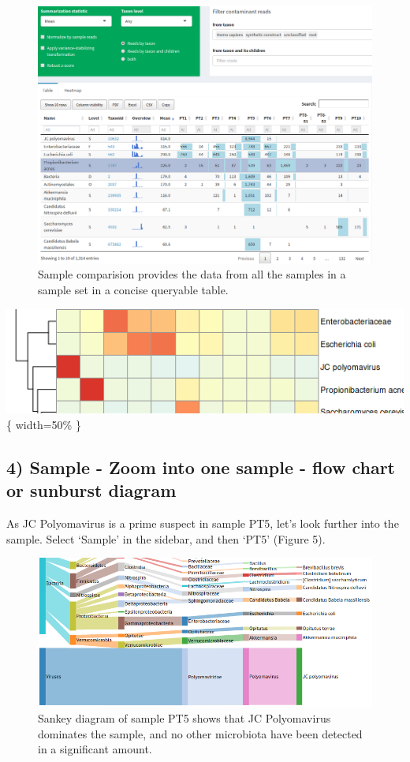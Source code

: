 \documentclass[]{article}
\begin{document}
\begin{figure}[htbp]
\centering
\includegraphics{menu-comp.png}
\caption{Sample comparision provides the data from all the samples in a
sample set in a concise queryable table.}
\end{figure}

\includegraphics{comp-heatmap1.png}\{ width=50\% \}

\subsection{4) Sample - Zoom into one sample - flow chart or sunburst
diagram}\label{sample---zoom-into-one-sample---flow-chart-or-sunburst-diagram}

As JC Polyomavirus is a prime suspect in sample PT5, let's look further
into the sample. Select `Sample' in the sidebar, and then `PT5' (Figure
5).

\begin{figure}[htbp]
\centering
\includegraphics{flow-pt5.png}
\caption{Sankey diagram of sample PT5 shows that JC Polyomavirus
dominates the sample, and no other microbiota have been detected in a
significant amount.}
\end{figure}
\end{document}
